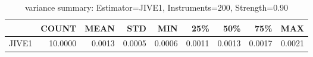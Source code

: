 \begin{table}[ht]
\centering
\caption{variance summary: Estimator=JIVE1, Instruments=200, Strength=0.90}
\begin{tabular}{lrrrrrrrr}
\toprule
 & COUNT & MEAN & STD & MIN & 25\% & 50\% & 75\% & MAX \\
\midrule
JIVE1 & 10.0000 & 0.0013 & 0.0005 & 0.0006 & 0.0011 & 0.0013 & 0.0017 & 0.0021 \\
\bottomrule
\end{tabular}
\end{table}
